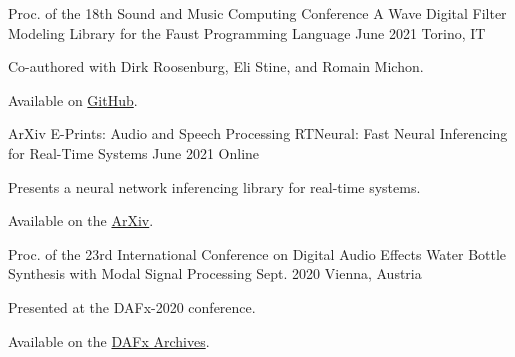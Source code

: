 

\begin{cventries}

  \cventry
    {Proc. of the 18th Sound and Music Computing Conference} %
    {A Wave Digital Filter Modeling Library for the Faust Programming Language} %
    {June 2021} %
    {Torino, IT} %
    {
      \begin{cvitems} %
        \item {Co-authored with Dirk Roosenburg, Eli Stine, and Romain Michon.}
        \item {Available on \href{https://github.com/droosenb/faust-wdf-library/blob/main/SMC-2021-paper/a-wave-digital-filter-modeling-library-for-faust.pdf}{GitHub}.}
      \end{cvitems}
    }

  \cventry
    {ArXiv E-Prints: Audio and Speech Processing} %
    {RTNeural: Fast Neural Inferencing for Real-Time Systems} %
    {June 2021} %
    {Online} %
    {
      \begin{cvitems} %
        \item {Presents a neural network inferencing library for real-time systems.}
        \item {Available on the \href{https://arxiv.org/pdf/2106.03037.pdf}{ArXiv}.}
      \end{cvitems}
    }

  \cventry
    {Proc. of the 23rd International Conference on Digital Audio Effects} %
    {Water Bottle Synthesis with Modal Signal Processing} %
    {Sept. 2020} %
    {Vienna, Austria} %
    {
      \begin{cvitems} %
        \item {Presented at the DAFx-2020 conference.}
        \item {Available on the \href{https://www.dafx.de/paper-archive/2020/proceedings/papers/DAFx2020_paper_24.pdf}{DAFx Archives}.}
      \end{cvitems}
    }


\end{cventries}
